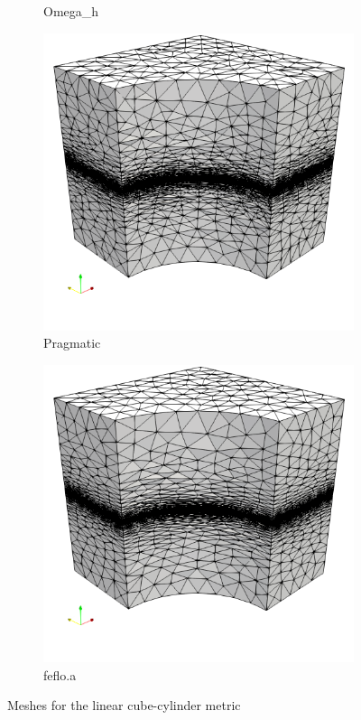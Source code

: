 \documentclass[3p,times,procedia,number]{elsarticle}
\begin{document}
\begin{figure}
\begin{subfigure}{.24\textwidth}
\caption{Omega\_h}
\end{subfigure}
\begin{subfigure}{.24\textwidth}
\centering
\includegraphics[width=\textwidth]{pragmatic-cube-cylinder-linear.png}
\caption{Pragmatic}
\end{subfigure}
\begin{subfigure}{.24\textwidth}
\centering
\includegraphics[width=\textwidth]{fefloa-cube-cylinder-linear.png}
\caption{feflo.a}
\end{subfigure}
\caption{Meshes for the linear cube-cylinder metric}
\label{fig:cube-cylinder-linear-meshes}
\end{figure}
\end{document}
